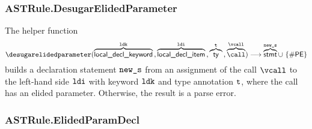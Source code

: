 \begin{mathpar}
\end{mathpar}

\subsubsection{ASTRule.DesugarElidedParameter}
\hypertarget{def-desugarelidedparameter}{}
The helper function
\[
\desugarelidedparameter(
  \overname{\localdeclkeyword}{\ldk} \aslsep
  \overname{\localdeclitem}{\ldi} \aslsep
  \overname{\ty}{\vt} \aslsep
  \overname{\call}{\vcall})
\aslto \overname{\stmt}{\news}
\cup\ \{\ParseError\}
\]
builds a declaration statement $\news$ from an assignment of the call $\vcall$ to the left-hand side $\ldi$ with keyword $\ldk$ and type annotation $\vt$, where the call has an elided parameter.
Otherwise, the result is a parse error.

\begin{mathpar}
\end{mathpar}

\subsubsection{ASTRule.ElidedParamDecl}
\begin{mathpar}
\end{mathpar}

